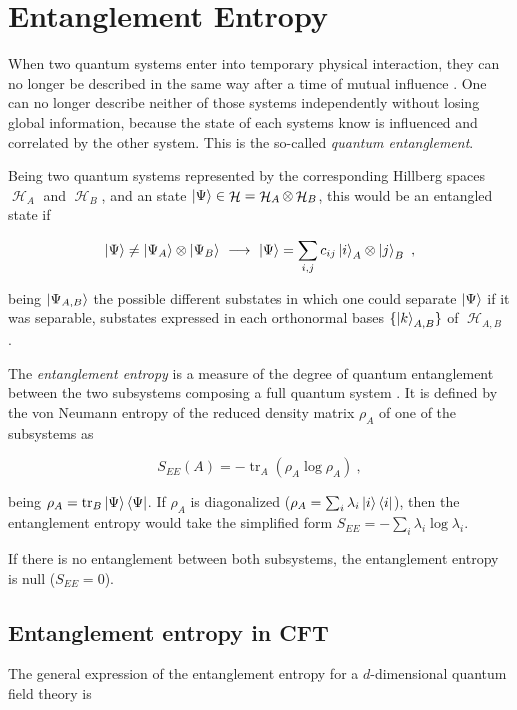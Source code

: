 \documentclass[twocolumn]{revtex4}
\providecommand{\eq}[2]{
    \begin{equation}
        #2
    \label{eq:#1}
    \end{equation}
}
\DeclareMathOperator{\calH}{\mathcal{H}}
\DeclareMathOperator{\tr}{tr}
\begin{document}
\section{Entanglement Entropy} \label{s:EE}

When two quantum systems enter into temporary physical interaction, they can no longer be described in the same way after a time of mutual influence \cite{schrodinger_discussion_1935}. One can no longer describe neither of those systems independently without losing global information, because the state of each systems know is influenced and correlated by the other system. This is the so-called \textit{quantum entanglement}.

Being two quantum systems represented by the corresponding Hillberg spaces $\calH_A$ and $\calH_B$, and an state $\ket{\Psi} \in \calH = \calH_A \otimes \calH_B$, this would be an entangled state if
\eq{entanglement}{
    \ket{\Psi} \neq \ket{\Psi_A} \otimes \ket{\Psi_B} \ \longrightarrow \ \ket{\Psi} = \sum_{i,j} c_{ij} \ket{i}_A \otimes \ket{j}_B \ ,
}
being $\ket{\Psi_{A,B}}$ the possible different substates in which one could separate $\ket{\Psi}$ if it was separable, substates expressed in each orthonormal bases $\{ \ket{k}_{A,B} \}$ of $\calH_{A,B}$ \cite{}.

The \textit{entanglement entropy} is a measure of the degree of quantum entanglement between the two subsystems composing a full quantum system \cite{nishioka_entanglement_2018}. It is defined by the von
Neumann entropy of the reduced density matrix $\rho_A$ of one of the subsystems as
\eq{EE}{
    S_{EE}(A) = - \tr_A ( \rho_A \log \rho_A ) \ ,
}
being $\rho_A = \tr_B \ket{\Psi}\bra{\Psi}$. If $\rho_A$ is diagonalized ($\rho_A = \sum_i \lambda_i \ket{i}\bra{i}$), then the entanglement entropy would take the simplified form $S_{EE} = - \sum_i \lambda_i \log \lambda_i$.

If there is no entanglement between both subsystems, the entanglement entropy is null ($S_{EE} = 0$).


\subsection{Entanglement entropy in CFT} \label{ss:EE_CFT}

The general expression of the entanglement entropy for a $d$-dimensional quantum field theory is
\end{document}
